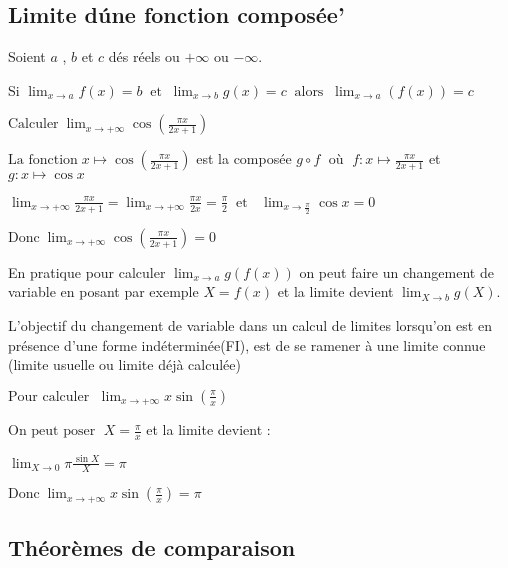 
\everymath{\displaystyle}

 \summary{}
     
    \subsection{Limite d\'une fonction composée'}
      Soient $a$ , $b$
        et  $c$ dés réels ou  $+\infty $ ou $-\infty $.
        
    Si\;  $\lim_{x \to a}f(x)=b \;\; \text{et}  \;\;  \lim_{x \to b}g(x)=c \;\; \text{alors} \;\;  \lim_{x \to a}(f(x))=c$
       \begin{example}
      $\text{Calculer}\; \lim_{x \to +\infty} \cos\left(\frac{\pi x}{2x+1}\right)$
      
       $ \text{La fonction} \; x \mapsto \cos\left(\frac{\pi x}{2x+1}\right)$ est la composée $ g\circ f\; $  où $\; f: x\mapsto\frac{\pi x}{2x+1}$  et $g: x \mapsto \cos x $
       
        $\lim_{x \to +\infty} \frac{\pi x}{2x+1}= \lim_{x \to +\infty} \frac{\pi x}{2x }=\frac{\pi }{2} \;\; \text{et }\;\; \lim_{x \to \frac{\pi }{2}} \cos x=0$
        
      $\text{Donc}\; \lim_{x \to +\infty} \cos\left(\frac{\pi x}{2x+1}\right)=0$
   \end{example}
     \begin{remark}
       En pratique pour calculer $\lim_{x \to a}g\left(f(x)\right) $ on peut faire  un changement de variable en posant par exemple   $X=f(x) $  et la limite devient  $\lim_{X \to b}g(X)$.
       
      L’objectif du changement de variable dans un calcul de limites lorsqu’on est en présence d’une forme indéterminée(FI), est de se ramener à une limite connue (limite usuelle ou limite déjà calculée)
     \end{remark}
\begin{example}
 $\text{Pour calculer }\; \lim_{x \to +\infty} x\sin \left(\frac{\pi}{x}\right)$
 
      $ \text{On peut poser } \; X=\frac{\pi }{x}$  et la limite devient :
      
      $\lim_{X\to 0} \pi\frac{\sin X }{X}=\pi $
      
       $\text{Donc}\; \lim_{x \to +\infty} x\sin \left(\frac{\pi}{x}\right)=\pi$
   \end{example}
      \subsection{Théorèmes de comparaison}
